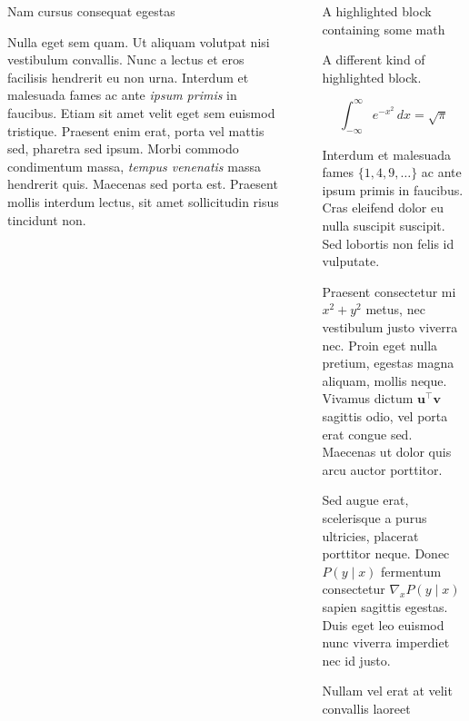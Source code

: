 \documentclass[final]{beamer}
\newlength{\sepwidth}
\newlength{\colwidth}
\newcommand{\separatorcolumn}{\begin{column}{\sepwidth}\end{column}}
\begin{document}
\begin{frame}[t]
\begin{columns}[t]
\begin{column}{\colwidth}
  \begin{block}{Nam cursus consequat egestas}

    Nulla eget sem quam. Ut aliquam volutpat nisi vestibulum convallis. Nunc a
    lectus et eros facilisis hendrerit eu non urna. Interdum et malesuada fames
    ac ante \textit{ipsum primis} in faucibus. Etiam sit amet velit eget sem
    euismod tristique. Praesent enim erat, porta vel mattis sed, pharetra sed
    ipsum. Morbi commodo condimentum massa, \textit{tempus venenatis} massa
    hendrerit quis. Maecenas sed porta est. Praesent mollis interdum lectus,
    sit amet sollicitudin risus tincidunt non.

  \end{block}

\end{column}

\separatorcolumn

\begin{column}{\colwidth}

  \begin{exampleblock}{A highlighted block containing some math}

    A different kind of highlighted block.

    $$
    \int_{-\infty}^{\infty} e^{-x^2}\,dx = \sqrt{\pi}
    $$

    Interdum et malesuada fames $\{1, 4, 9, \ldots\}$ ac ante ipsum primis in
    faucibus. Cras eleifend dolor eu nulla suscipit suscipit. Sed lobortis non
    felis id vulputate.


    Praesent consectetur mi $x^2 + y^2$ metus, nec vestibulum justo viverra
    nec. Proin eget nulla pretium, egestas magna aliquam, mollis neque. Vivamus
    dictum $\mathbf{u}^\intercal\mathbf{v}$ sagittis odio, vel porta erat
    congue sed. Maecenas ut dolor quis arcu auctor porttitor.


    Sed augue erat, scelerisque a purus ultricies, placerat porttitor neque.
    Donec $P(y \mid x)$ fermentum consectetur $\nabla_x P(y \mid x)$ sapien
    sagittis egestas. Duis eget leo euismod nunc viverra imperdiet nec id
    justo.

  \end{exampleblock}

  \begin{block}{Nullam vel erat at velit convallis laoreet}


\end{block}
\end{column}
\end{columns}
\end{frame}
\end{document}

